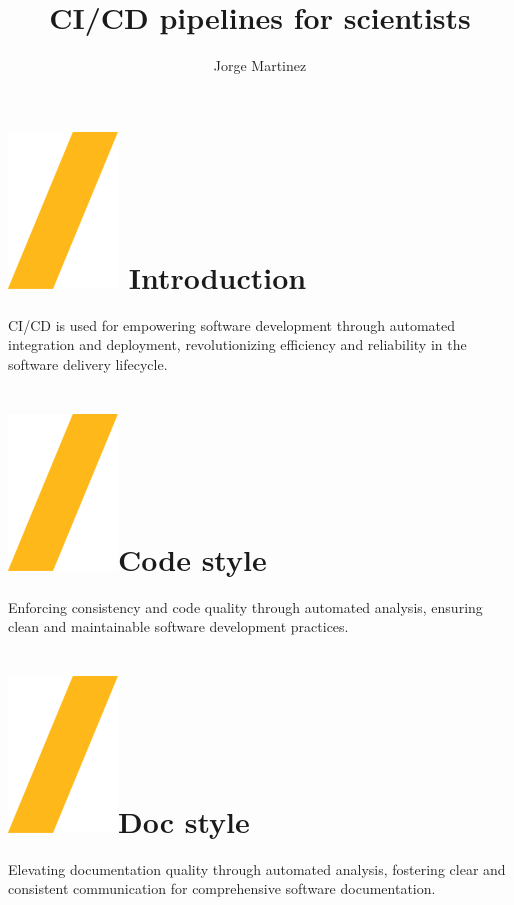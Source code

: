 \documentclass[a0paper,fleqn]{src/betterposter}
\begin{document}
{\title{CI\slash CD pipelines for scientists}
\author{Jorge Martinez}

\section{\includegraphics[height=\fontcharht\font`\S]{img/general/slash.png} Introduction}
CI/CD is used for empowering software development through automated integration
and deployment, revolutionizing efficiency and reliability in the software
delivery lifecycle.

\section{\includegraphics[height=\fontcharht\font`\S]{img/general/slash.png}Code style}
Enforcing consistency and code quality through automated analysis, ensuring
clean and maintainable software development practices.

\section{\includegraphics[height=\fontcharht\font`\S]{img/general/slash.png}Doc style}
Elevating documentation quality through automated analysis, fostering clear and
consistent communication for comprehensive software documentation.

}
\end{document}
